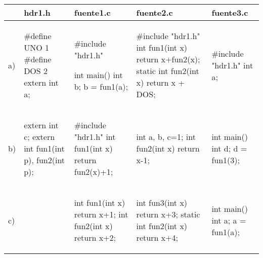 \begin{table}
\centering
\begin{tabular}{m{0.2cm}|m{3cm}|m{3.5cm}|m{3.5cm}|m{3cm}}
\hline
& hdr1.h & fuente1.c & fuente2.c & fuente3.c\\
\hline

a)
&
\begin{codecell}
#define UNO 1   
#define DOS 2 
extern int a;
\end{codecell}
&
\begin{codecell}
#include "hdr1.h"

int main() 
{ 
	int b;
	b = fun1(a);
}
\end{codecell}
&
\begin{codecell}
#include "hdr1.h"
int fun1(int x) 
{
	return x+fun2(x);
}
static int 
	fun2(int x) 
{
	return x + DOS;
}
\end{codecell}
&
\begin{codecell}
#include "hdr1.h"
int a;
\end{codecell}\\
\hline



b)
&
\begin{codecell}
extern int c;
extern int 
	fun1(int p), 
	fun2(int p);
\end{codecell}
&
\begin{codecell}
#include "hdr1.h"
int fun1(int x)
{
	return 
		fun2(x)+1;
}
\end{codecell}
&
\begin{codecell}
int a, b, c=1;
int fun2(int x)
{
	return x-1;
}
\end{codecell}
&
\begin{codecell}
int main()
{
	int d;
	d = fun1(3);
}
\end{codecell}\\
\hline



c)
&
\begin{codecell}
 
\end{codecell}
&
\begin{codecell}
int fun1(int x)
{
	return x+1;
}
int fun2(int x)
{
	return x+2;
}
\end{codecell}
&
\begin{codecell}
int fun3(int x)
{
	return x+3;
}
static int 
	fun2(int x)
{
	return x+4;
}
\end{codecell}
&
\begin{codecell}
int main()
{
	int a;
	a = fun1(a);
}
\end{codecell}\\
\hline


\end{tabular}
\end{table}
